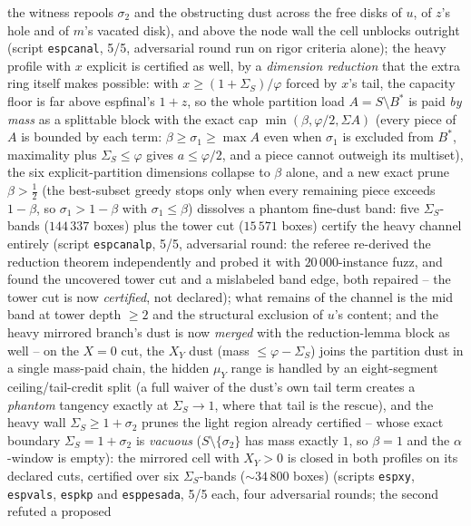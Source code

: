 \documentclass[11pt]{article}
\theoremstyle{definition}
\begin{document}
the witness repools $\sigma_2$ and the obstructing dust across
the free disks of $u$, of $z$'s hole and of $m$'s vacated disk),
and above the node wall the cell unblocks outright (script
\texttt{espcanal}, 5/5, adversarial round run on rigor criteria
alone); the heavy profile with $x$ explicit is certified as
well, by a \emph{dimension reduction} that the extra ring itself
makes possible: with $x\ge(1+\Sigma_S)/\varphi$ forced by $x$'s
tail, the capacity floor is far above espfinal's $1+z$, so the
whole partition load $A=S\setminus B^{*}$ is paid \emph{by mass}
as a splittable block with the exact cap
$\min(\beta,\varphi/2,\Sigma A)$ (every piece of $A$ is bounded
by each term: $\beta\ge\sigma_1\ge\max A$ even when $\sigma_1$
is excluded from $B^{*}$, maximality plus $\Sigma_S\le\varphi$
gives $a\le\varphi/2$, and a piece cannot outweigh its
multiset), the six explicit-partition dimensions collapse to
$\beta$ alone, and a new exact prune $\beta>\tfrac12$ (the
best-subset greedy stops only when every remaining piece exceeds
$1-\beta$, so $\sigma_1>1-\beta$ with $\sigma_1\le\beta$)
dissolves a phantom fine-dust band: five $\Sigma_S$-bands
($144\,337$ boxes) plus the tower cut ($15\,571$ boxes) certify
the heavy channel entirely (script \texttt{espcanalp}, 5/5,
adversarial round: the referee re-derived the reduction theorem
independently and probed it with $20\,000$-instance fuzz, and found the uncovered
tower cut and a mislabeled band edge, both repaired -- the tower
cut is now \emph{certified}, not declared); what remains of the
channel is the mid band at tower depth $\ge2$ and the structural
exclusion of $u$'s content; and
the heavy mirrored branch's dust is now \emph{merged} with the
reduction-lemma block as well -- on the $X=0$ cut, the $X_Y$ dust
(mass $\le\varphi-\Sigma_S$) joins the partition dust in a single
mass-paid chain, the hidden $\mu_Y$ range is handled by an
eight-segment ceiling/tail-credit split (a full waiver of the
dust's own tail term creates a \emph{phantom} tangency exactly at
$\Sigma_S\to1$, where that tail is the rescue), and the heavy wall
$\Sigma_S\ge1+\sigma_2$ prunes the light region already certified
-- whose exact boundary $\Sigma_S=1+\sigma_2$ is \emph{vacuous}
($S\setminus\{\sigma_2\}$ has mass exactly $1$, so $\beta=1$ and
the $\alpha$-window is empty): the mirrored cell with $X_Y>0$ is
closed in both profiles on its declared cuts, certified over six
$\Sigma_S$-bands ($\sim34\,800$ boxes) (scripts \texttt{espxy},
\texttt{espvals}, \texttt{espkp} and \texttt{esppesada}, 5/5 each,
four adversarial rounds; the second refuted a proposed
\end{document}
